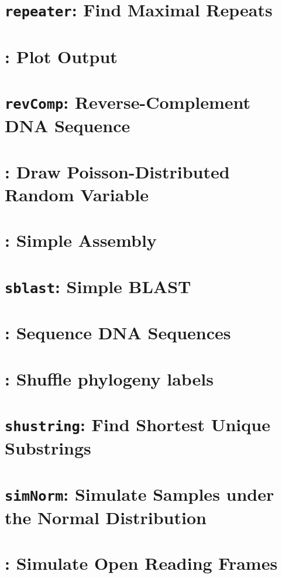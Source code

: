 \documentclass[a4paper]{book}
\begin{document}
\chapter{\texttt{repeater}: Find Maximal
  Repeats}\label{ch:rep}

\chapter{: Plot 
  Output}\label{ch:r2p}

\chapter{\texttt{revComp}: Reverse-Complement DNA
  Sequence}\label{ch:rev}

\chapter{: Draw Poisson-Distributed Random
  Variable}\label{ch:rpo}

\chapter{: Simple Assembly}\label{ch:sas}

\chapter{\texttt{sblast}: Simple BLAST}\label{ch:sb}

\chapter{: Sequence DNA Sequences}\label{ch:seq}

\chapter{: Shuffle phylogeny labels}\label{ch:sp}

\chapter{\texttt{shustring}: Find Shortest Unique Substrings}\label{ch:shu}

\chapter{\texttt{simNorm}: Simulate Samples under the Normal
  Distribution}\label{ch:sn}

\chapter{: Simulate Open Reading
  Frames}\label{ch:so}

\end{document}
